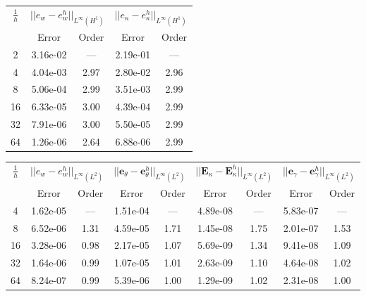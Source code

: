 \begin{table}[hp]
	\centering
	\begin{tabular}{ccccc}
		\hline 
		\multirow{2}{*}{$\frac{1}{h}$} & \multicolumn{2}{c}{$||e_w - e_w^h||_{L^{\infty}(H^1)}$}  & \multicolumn{2}{c}{$||e_\kappa - e_\kappa^h||_{L^{\infty}(H^1)}$}   \\ 
		& Error & Order  & Error & Order  \\
		\hline 
		2  & 3.16e-02 & ---  & 2.19e-01 & ---  \\ 
		4  & 4.04e-03 & 2.97 & 2.80e-02 & 2.96 \\ 
		8  & 5.06e-04 & 2.99 & 3.51e-03 & 2.99 \\ 
		16 & 6.33e-05 & 3.00 & 4.39e-04 & 2.99 \\ 
		32 & 7.91e-06 & 3.00 & 5.50e-05 & 2.99 \\ 
		64 & 1.26e-06 & 2.64 & 6.88e-06 & 2.99 \\
		\hline 
	\end{tabular} 
	\captionsetup{width=0.95\linewidth}
	\vspace{1mm}
	\label{tab:resebCGCG_k3}
\end{table}	

\begin{table}[hp]
	\centering
	\begin{tabular}{ccccccccc}
		\hline 
		\multirow{2}{*}{$\frac{1}{h}$} & \multicolumn{2}{c}{$||e_w - e_w^h||_{L^{\infty}(L^2)}$}    & \multicolumn{2}{c}{$||\bm{e}_\theta - \bm{e}_\theta^h||_{L^{\infty}(L^2)}$} & \multicolumn{2}{c}{$||\bm{E}_\kappa - \bm{E}_\kappa^h||_{L^{\infty}(L^2)}$} & \multicolumn{2}{c}{$||\bm{e}_\gamma - \bm{e}_\gamma^ h||_{L^{\infty}(L^2)}$}   \\ 
		& Error & Order  & Error & Order  & Error & Order  & Error & Order   \\ 
		\hline 
		4  & 1.62e-05 & ---  & 1.51e-04 & ---  & 4.89e-08 & ---  & 5.83e-07 & --- \\ 
		8  & 6.52e-06 & 1.31 & 4.59e-05 & 1.71 & 1.45e-08 & 1.75 & 2.01e-07 & 1.53\\ 
		16 & 3.28e-06 & 0.98 & 2.17e-05 & 1.07 & 5.69e-09 & 1.34 & 9.41e-08 & 1.09\\ 
		32 & 1.64e-06 & 0.99 & 1.07e-05 & 1.01 & 2.63e-09 & 1.10 & 4.64e-08 & 1.02\\ 
		64 & 8.24e-07 & 0.99 & 5.39e-06 & 1.00 & 1.29e-09 & 1.02 & 2.31e-08 & 1.00\\ 
		\hline 
	\end{tabular} 
	\captionsetup{width=0.95\linewidth}
	\vspace{1mm}
	\label{tab:resminBTJ_k1}
\end{table}

